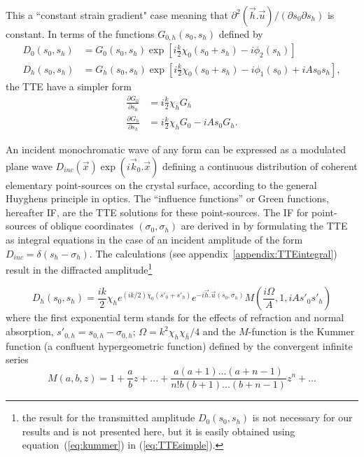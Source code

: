 \documentclass[preprint]{iucr}              %
\begin{document}
This a 
``constant strain gradient" case \cite{authierbook} meaning that $\partial^2(\vec h . \vec u)/(\partial s_0 \partial s_h)$ is constant. In terms of the functions $G_{0,h}(s_0,s_h)$ defined by
\begin{subequations}
    \label{eq:functionsG}
    \begin{align}
      D_0(s_0,s_h) &= G_0(s_0,s_h) \exp[i\frac{k}{2}\chi_0 (s_0+s_h)-i \phi_2(s_h)]\\
      D_h(s_0,s_h) &= G_h(s_0,s_h) \exp[i\frac{k}{2}\chi_0 (s_0+s_h)-i \phi_1(s_0)+iAs_0s_h],
    \end{align}
\end{subequations}
the TTE have a simpler form
\begin{subequations}
    \label{eq:TTEsimple}
    \begin{align}
      \frac{\partial G_0}{\partial s_0} &= i \frac{k}{2}\chi_{\bar{h}} G_h
      \\
      \frac{\partial G_h}{\partial s_h} &= i \frac{k}{2}\chi_{h} G_0 - i A s_0 G_h.
    \end{align}
\end{subequations}

An incident monochromatic wave of any form can be expressed as a modulated plane wave $D_{inc}(\vec x)\exp(i \vec k_0 . \vec x)$ defining a continuous distribution of coherent elementary point-sources on the crystal surface, according to the general Huyghens principle in optics. The “influence functions” or Green functions, hereafter IF, are the TTE solutions for these point-sources. 
The IF for point-sources of oblique coordinates $(\sigma_0,\sigma_h)$
are derived in \cite{GuigayFerrero2016} by formulating the TTE  as integral equations in the case of an incident amplitude of the form $D_{inc}=\delta(s_h-\sigma_h)$. 
The calculations (see appendix~\ref{appendix:TTEintegral}) result in the diffracted amplitude\footnote{the result for the transmitted amplitude $D_0(s_0,s_h)$ is not necessary for our results and is not presented here, but it is easily obtained using equation~(\ref{eq:kummer}) in (\ref{eq:TTEsimple}).}

  
\begin{equation}
\label{eq:kummer}
    D_h(s_0,s_h) = \frac{i k }{2} \chi_h e^{(ik/2) \chi_0 (s'_0 + s'_h)} e^{-i \vec h . \vec u (s_0,\sigma_h)} M(\frac{i\Omega}{A},1,iA s'_0 s'_h)
\end{equation}
where the first exponential term stands for the effects of refraction and normal absorption, $s'_{0,h}=s_{0,h}-\sigma_{0,h}$; $\Omega=k^2\chi_h\chi_{\bar{h}}/4$ and the $M$-function is the Kummer function (a confluent hypergeometric function) defined by the convergent infinite series
\begin{equation}
\label{eq:kummerSeries}
    M(a,b,z) = 1 + \frac{a}{b} z + 
    ... + \frac{a(a+1)...(a+n-1)}{n! b (b+1)...(b+n-1)}z^n+...
\end{equation}
\end{document}
